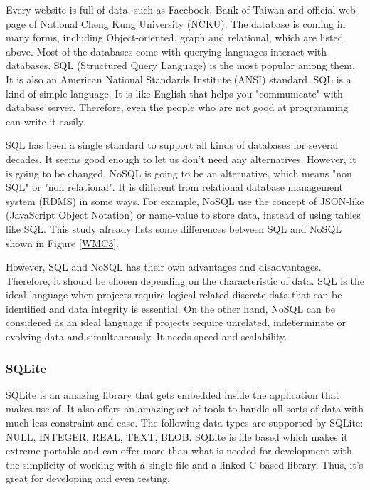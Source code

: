 Every website is full of data, such as Facebook, Bank of Taiwan and official web page of National Cheng Kung University (NCKU).
The database is coming in many forms, including Object-oriented, graph and relational, which are listed above.
Most of the databases come with querying languages interact with databases.
SQL (Structured Query Language) is the most popular among them.
It is also an American National Standards Institute (ANSI) standard.
SQL is a kind of simple language.
It is like English that helps you "communicate" with database server.
Therefore, even the people who are not good at programming can write it easily.


SQL has been a single standard to support all kinds of databases for several decades.
It seems good enough to let us don't need any alternatives.
However, it is going to be changed.
NoSQL is going to be an alternative, which means "non SQL" or "non relational".
It is different from relational database management system (RDMS) in some ways.
For example, NoSQL use the concept of JSON-like (JavaScript Object Notation) or name-value to store data, instead of using tables like SQL.
This study already lists some differences between SQL and NoSQL shown in Figure \ref{WMC3}.


However, SQL and NoSQL has their own advantages and disadvantages.
Therefore, it should be chosen depending on the characteristic of data.
SQL is the ideal language when projects require logical related discrete data that can be identified and data integrity is essential.
On the other hand, NoSQL can be considered as an ideal language if projects require unrelated, indeterminate or evolving data and simultaneously. 
It needs speed and scalability.

\subsubsection{SQLite}
SQLite is an amazing library that gets embedded inside the 
application that makes use of. It also offers an amazing 
set of tools to handle all sorts of data with much less 
constraint and ease. The following data types are supported 
by SQLite: NULL, INTEGER, REAL, TEXT, BLOB. SQLite is file
based which makes it extreme portable and can offer more than 
what is needed for development with the simplicity of working 
with a single file and a linked C based library. Thus, it's 
great for developing and even testing.

